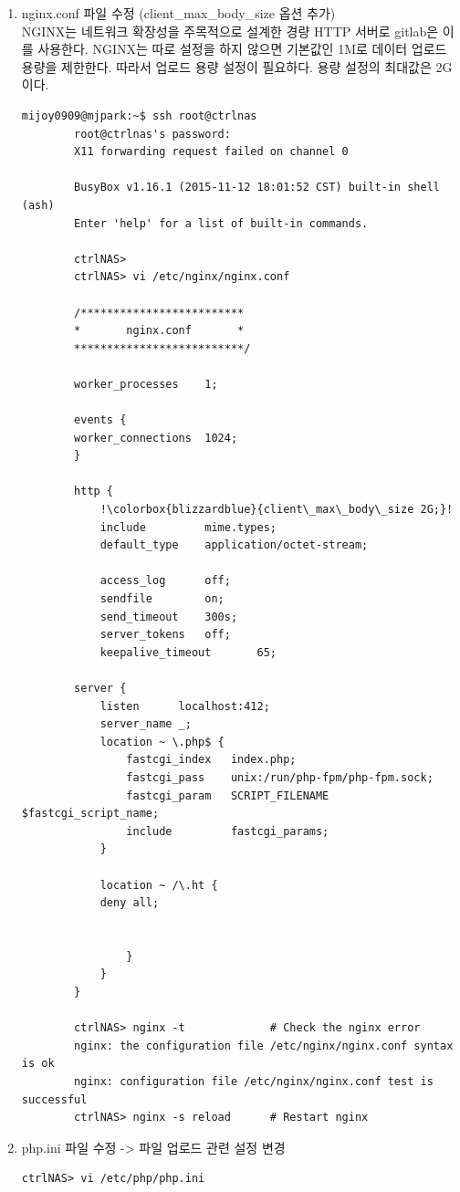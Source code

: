 \documentclass[11pt
  , a4paper
  , article
  , oneside
]{memoir}
\begin{document}
\begin{itemize}
\begin{itemize}
		\begin{enumerate}
		\item nginx.conf 파일 수정 (client\_max\_body\_size 옵션 추가)\\
		NGINX는 네트워크 확장성을 주목적으로 설계한 경량 HTTP 서버\citep{nginx}로 gitlab은 이를 사용한다. NGINX는 따로 설정을 하지 않으면 기본값인 1M로 데이터 업로드 용량을 제한한다. 따라서 업로드 용량 설정이 필요하다. 용량 설정의 최대값은 2G이다. 
		
		{\scriptsize
		\begin{lstlisting}[style=termstyle, escapechar=!]
		mijoy0909@mjpark:~$ ssh root@ctrlnas
		root@ctrlnas's password: 
		X11 forwarding request failed on channel 0
		
		BusyBox v1.16.1 (2015-11-12 18:01:52 CST) built-in shell (ash)
		Enter 'help' for a list of built-in commands.
		
		ctrlNAS> 
		ctrlNAS> vi /etc/nginx/nginx.conf 
		
		/*************************
		*       nginx.conf       *
		**************************/
		
		worker_processes    1;
		
		events {
		worker_connections  1024;
		}
		
		http {
			!\colorbox{blizzardblue}{client\_max\_body\_size 2G;}!
			include         mime.types;
			default_type    application/octet-stream;
		
			access_log      off;
			sendfile        on;
			send_timeout    300s;
			server_tokens   off;
			keepalive_timeout       65;
		
		server {
			listen      localhost:412;
			server_name _;
			location ~ \.php$ {
				fastcgi_index   index.php;
				fastcgi_pass    unix:/run/php-fpm/php-fpm.sock;
				fastcgi_param   SCRIPT_FILENAME $fastcgi_script_name;
				include         fastcgi_params;
			}
		
			location ~ /\.ht {
			deny all;
		
		
				}
			}
		}
				
		ctrlNAS> nginx -t             # Check the nginx error
		nginx: the configuration file /etc/nginx/nginx.conf syntax is ok
		nginx: configuration file /etc/nginx/nginx.conf test is successful
		ctrlNAS> nginx -s reload      # Restart nginx 
	\end{lstlisting}
	}
		
	\item php.ini 파일 수정 -> 파일 업로드 관련 설정 변경
	{\scriptsize
	\begin{lstlisting}[style=termstyle, escapechar=!]
	ctrlNAS> vi /etc/php/php.ini 


\end{lstlisting}}
\end{enumerate}
\end{itemize}
\end{itemize}
\end{document}
